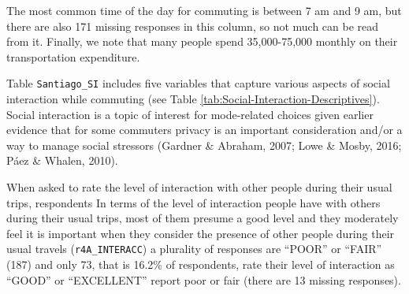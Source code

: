 \documentclass[
11pt, %
oneside, %
english, %
singlespacing, %
]{macthesis} %
\begin{document}
The most common time of the day for commuting is between 7 am and 9 am, but there are also 171 missing responses in this column, so not much can be read from it. Finally, we note that many people spend 35,000-75,000 monthly on their transportation expenditure.
\begin{table}

\caption{\label{tab:unnamed-chunk-10}\label{tab:Travel-work-Descriptive}Variables regarding the commuting behavior of respondents}
\centering
{}
\end{table}
Table \texttt{Santiago\_SI} includes five variables that capture various aspects of social interaction while commuting (see Table \ref{tab:Social-Interaction-Descriptives}). Social interaction is a topic of interest for mode-related choices given earlier evidence that for some commuters privacy is an important consideration and/or a way to manage social stressors (Gardner \& Abraham, 2007; Lowe \& Mosby, 2016; Páez \& Whalen, 2010).

When asked to rate the level of interaction with other people during their usual trips, respondents In terms of the level of interaction people have with others during their usual trips, most of them presume a good level and they moderately feel it is important when they consider the presence of other people during their usual travels (\texttt{r4A\_INTERACC}) a plurality of responses are ``POOR'' or ``FAIR'' (187) and only 73, that is 16.2\% of respondents, rate their level of interaction as ``GOOD'' or ``EXCELLENT'' report poor or fair (there are 13 missing responses).
\end{document}

